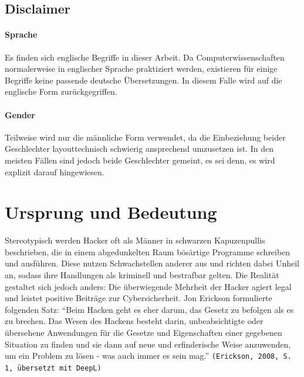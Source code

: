 \documentclass[11pt, a4paper]{article}
\begin{document}
\subsection{Disclaimer}
\paragraph{Sprache}
Es finden sich englische Begriffe in dieser Arbeit. Da Computerwissenschaften normalerweise in englischer Sprache praktiziert werden, existieren für einige Begriffe keine passende deutsche Übersetzungen. In diesem Falle wird auf die englische Form zurückgegriffen.
\paragraph{Gender}
Teilweise wird nur die männliche Form verwendet, da die Einbeziehung beider Geschlechter layouttechnisch schwierig ansprechend umzusetzen ist. In den meisten Fällen sind jedoch beide Geschlechter gemeint, es sei denn, es wird explizit darauf hingewiesen.

\newpage
\section{Ursprung und Bedeutung}
Stereotypisch werden Hacker oft als Männer in schwarzen Kapuzenpullis beschrieben, die in einem abgedunkelten Raum bösärtige Programme schreiben und ausführen. Diese nutzen Schwachstellen anderer aus und richten dabei Unheil an, sodass ihre Handlungen als kriminell und bestrafbar gelten. Die Realität gestaltet sich jedoch anders: Die überwiegende Mehrheit der Hacker agiert legal und leistet positive Beiträge zur Cybersicherheit. Jon Erickson formulierte folgenden Satz: ``Beim Hacken geht es eher darum, das Gesetz zu befolgen als es zu brechen. Das Wesen des Hackens besteht darin, unbeabsichtigte oder übersehene Anwendungen für die Gesetze und Eigenschaften einer gegebenen Situation zu finden und sie dann auf neue und erfinderische Weise anzuwenden, um ein Problem zu lösen - was auch immer es sein mag.'' \texttt{(Erickson, 2008, S. 1, übersetzt mit DeepL)} \cite{erickson2008hacking}
\end{document}
